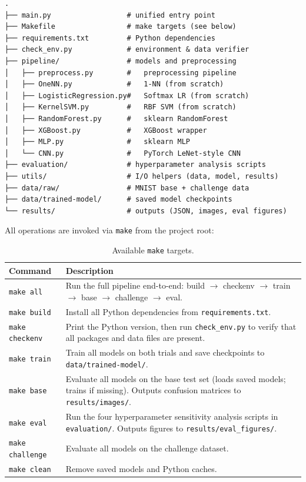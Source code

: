 \documentclass[11pt,a4paper]{article}
\begin{document}
\begin{verbatim}
.
├── main.py                  # unified entry point
├── Makefile                 # make targets (see below)
├── requirements.txt         # Python dependencies
├── check_env.py             # environment & data verifier
├── pipeline/                # models and preprocessing
│   ├── preprocess.py        #   preprocessing pipeline
│   ├── OneNN.py             #   1-NN (from scratch)
│   ├── LogisticRegression.py#   Softmax LR (from scratch)
│   ├── KernelSVM.py         #   RBF SVM (from scratch)
│   ├── RandomForest.py      #   sklearn RandomForest
│   ├── XGBoost.py           #   XGBoost wrapper
│   ├── MLP.py               #   sklearn MLP
│   └── CNN.py               #   PyTorch LeNet-style CNN
├── evaluation/              # hyperparameter analysis scripts
├── utils/                   # I/O helpers (data, model, results)
├── data/raw/                # MNIST base + challenge data
├── data/trained-model/      # saved model checkpoints
└── results/                 # outputs (JSON, images, eval figures)
\end{verbatim}

\noindent All operations are invoked via \texttt{make} from the project root:

\begin{table}[H]
    \centering
    \renewcommand{\arraystretch}{1.15}
    \small
    \begin{tabular}{lp{9cm}}
        \toprule
        \textbf{Command} & \textbf{Description} \\
        \midrule
        \texttt{make all}       & Run the full pipeline end-to-end: build $\to$ checkenv $\to$ train $\to$ base $\to$ challenge $\to$ eval. \\
        \texttt{make build}     & Install all Python dependencies from \texttt{requirements.txt}. \\
        \texttt{make checkenv}  & Print the Python version, then run \texttt{check\_env.py} to verify that all packages and data files are present. \\
        \texttt{make train}     & Train all models on both trials and save checkpoints to \texttt{data/trained-model/}. \\
        \texttt{make base}      & Evaluate all models on the base test set (loads saved models; trains if missing). Outputs confusion matrices to \texttt{results/images/}. \\
        \texttt{make eval}      & Run the four hyperparameter sensitivity analysis scripts in \texttt{evaluation/}. Outputs figures to \texttt{results/eval\_figures/}. \\
        \texttt{make challenge} & Evaluate all models on the challenge dataset. \\
        \texttt{make clean}     & Remove saved models and Python caches. \\
        \bottomrule
    \end{tabular}
    \caption{Available \texttt{make} targets.}
\end{table}
\end{document}
